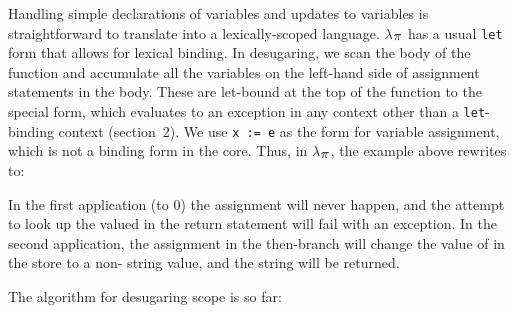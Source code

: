 \documentclass[10pt]{sigplanconf}
\newcommand{\ChapRef}[2]{\SecRef{#1}{#2}}
\newcommand{\SecRef}[2]{section~#1}
\newcommand{\ChapRefLocal}[3]{\ChapRef{#2}{#3}}
\newcommand{\Scribtexttt}[1]{{\texttt{#1}}}
\newcommand{\textsub}[1]{$_{\hbox{\textsmaller{#1}}}$}
\newcommand{\Larger}[1]{\textlarger{#1}}
\newenvironment{SCentered}{\begin{trivlist}\item \centering}{\end{trivlist}}
\begin{document}
Handling simple declarations of variables and updates to variables is
straightforward to translate into a lexically{-}scoped language.  $\lambda$\textsub{\Larger{$\pi$}}
has a usual \Scribtexttt{let} form that allows for lexical binding.  In desugaring, we
scan the body of the function and accumulate all the variables on the left{-}hand
side of assignment statements in the body.  These are let{-}bound at the top of
the function to the special  form, which evaluates to an
exception in any context other than a \Scribtexttt{let}{-}binding context (\ChapRefLocal{t:x28part_x22sx3awarmupx22x29}{2}{Warmup: A Quick Tour of $\lambda$\textsub{\Larger{$\pi$}}}).  We use
\Scribtexttt{x {\hbox{\texttt{:}}}= e} as the form for variable assignment, which is not a
binding form in the core.  Thus, in $\lambda$\textsub{\Larger{$\pi$}}, the example above rewrites to:


\noindent \begin{SCentered}\end{SCentered}

\noindent In the first application (to 0) the assignment will never happen, and the
attempt to look up the valued  in the
return statement will fail with an exception.  In the second application, the
assignment in the then{-}branch will change the value of  in the
store to a non{-} string value, and the string
 will be returned.

The algorithm for desugaring scope is so far:
\end{document}
